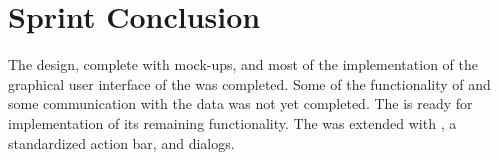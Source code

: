 
\chapter{Sprint Conclusion}
\label{cha:conclusion_sprint_2}

The design, complete with mock-ups, and most of the implementation of the graphical user interface of the \ct was completed. Some of the functionality of \ct and some communication with the data was not yet completed. The \ct is ready for implementation of its remaining functionality. The \gc was extended with , a standardized action bar, and dialogs.  